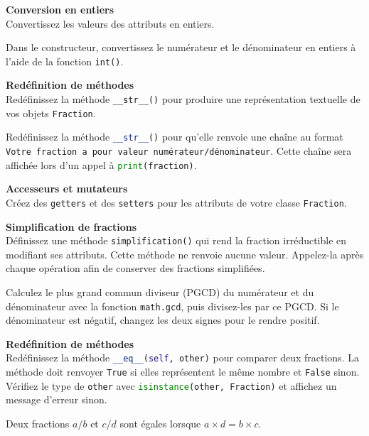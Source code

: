 \begin{Exercice}[5 minutes] \textbf{Conversion en entiers}\\
		Convertissez les valeurs des attributs en entiers.
	\begin{conseil}
		Dans le constructeur, convertissez le numérateur et le dénominateur en entiers à l'aide de la fonction \lstinline{int()}.
	\end{conseil}
\end{Exercice}

\begin{Exercice}[5 minutes] \textbf{Redéfinition de méthodes} \\
		Redéfinissez la méthode \lstinline{__str__()} pour produire une représentation textuelle de vos objets \lstinline{Fraction}.
	\begin{conseil}
			Redéfinissez la méthode \lstinline[language=Python]|__str__()| pour qu'elle renvoie une chaîne au format \texttt{Votre fraction a pour valeur numérateur/dénominateur}. Cette chaîne sera affichée lors d'un appel à \lstinline[language=Python]|print(fraction)|.
	\end{conseil}
\end{Exercice}

\begin{Exercice} [5 minutes] \textbf{Accesseurs et mutateurs} \\
		Créez des \lstinline{getters} et des \lstinline{setters} pour les attributs de votre classe \lstinline{Fraction}.
\end{Exercice}

\begin{Exercice} [10 minutes] \textbf{Simplification de fractions}\\
		Définissez une méthode \lstinline[language=Python]{simplification()} qui rend la fraction irréductible en modifiant ses attributs. Cette méthode ne renvoie aucune valeur. Appelez-la après chaque opération afin de conserver des fractions simplifiées.

	\begin{conseil}
		Calculez le plus grand commun diviseur (PGCD) du numérateur et du dénominateur avec la fonction \lstinline[language=Python]|math.gcd|, puis divisez-les par ce PGCD. Si le dénominateur est négatif, changez les deux signes pour le rendre positif.
	\end{conseil}
\end{Exercice}

\begin{Exercice}[15 minutes] \textbf{Redéfinition de méthodes}\\
		Redéfinissez la méthode \lstinline[language=Python]|__eq__(self, other)| pour comparer deux fractions. La méthode doit renvoyer \lstinline|True| si elles représentent le même nombre et \lstinline|False| sinon.
		Vérifiez le type de \lstinline{other} avec \lstinline[language=Python]|isinstance(other, Fraction)| et affichez un message d'erreur sinon.
	\begin{conseil}
		Deux fractions \(a/b\) et \(c/d\) sont égales lorsque \(a\times d=b\times c\). 
	\end{conseil}
\end{Exercice}

